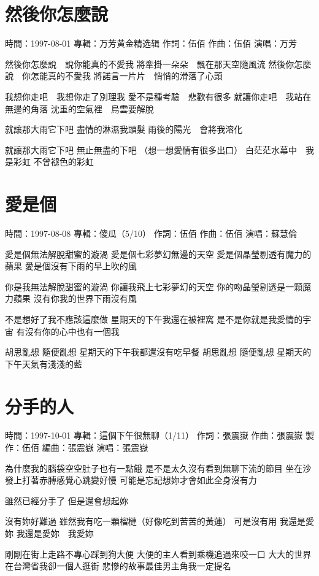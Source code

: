 \documentclass[UTF8,a4paper,oneside,twocolumn,12pt]{ctexbook}
\newcommand{\infopair}[2]{\textbullet #1：#2}
\newcommand{\zc}[1][伍佰]{\infopair{作詞}{#1}}
\newcommand{\zq}[1][伍佰]{\infopair{作曲}{#1}}
\newcommand{\bq}[1][伍佰]{\infopair{編曲}{#1}}
\newcommand{\zj}[1]{\infopair{專輯}{#1}}
\newcommand{\zz}[1]{\infopair{製作}{#1}}
\newcommand{\sj}[1]{\infopair{時間}{#1}}
\newenvironment{info}{\begin{flushleft}\kaishu
	}
	{\end{flushleft}\normalsize\yahei\par}
\newenvironment{lyric}{
	}
{}
\begin{document}
\section{然後你怎麼說}
\begin{info}
	\sj{1997-08-01}
	\zj{万芳黄金精选辑}
	\zc
	\zq
	\infopair{演唱}{万芳}
\end{info}
\begin{lyric}
	然後你怎麼說　說你能真的不愛我
	將牽掛一朵朵　飄在那天空隨風流
	然後你怎麼說　你怎能真的不愛我
	將諾言一片片　悄悄的滑落了心頭

	我想你走吧　我想你走了別理我
	愛不是種考驗　悲歡有很多
	就讓你走吧　我站在無邊的角落
	沈重的空氣裡　烏雲要解脫

	就讓那大雨它下吧
	盡情的淋濕我頭髮
	雨後的陽光　會將我溶化

	就讓那大雨它下吧
	無止無盡的下吧
	（想一想愛情有很多出口）
	白茫茫水幕中　我是彩虹
	不曾褪色的彩虹
\end{lyric}

\section{愛是個}
\begin{info}
	\sj{1997-08-08}
	\zj{傻瓜（5/10）}
	\zc
	\zq
	\infopair{演唱}{蘇慧倫}
\end{info}
\begin{lyric}
	愛是個無法解脫甜蜜的漩渦
	愛是個七彩夢幻無邊的天空
	愛是個晶瑩剔透有魔力的蘋果
	愛是個沒有下雨的早上吹的風

	你是我無法解脫甜蜜的漩渦
	你讓我飛上七彩夢幻的天空
	你的吻晶瑩剔透是一顆魔力蘋果
	沒有你我的世界下雨沒有風

	不是想好了我不應該這麼做
	星期天的下午我還在被裡窩
	是不是你就是我愛情的宇宙
	有沒有你的心中也有一個我

	胡思亂想 隨便亂想 星期天的下午我都還沒有吃早餐
	胡思亂想 隨便亂想 星期天的下午天氣有淺淺的藍
\end{lyric}

\section{分手的人}
\begin{info}
	\sj{1997-10-01}
	\zj{這個下午很無聊（1/11）}
	\zc[張震嶽]
	\zq[張震嶽]
	\zz{伍佰}
	\bq[張震嶽]
	\infopair{演唱}{張震嶽}
\end{info}
\begin{lyric}
	為什麼我的腦袋空空肚子也有一點餓
	是不是太久沒有看到無聊下流的節目
	坐在沙發上打著赤膊感覺心跳變好慢
	可能是忘記想妳才會如此全身沒有力

	雖然已經分手了 但是還會想起妳

	沒有妳好難過
	雖然我有吃一顆榴槤（好像吃到苦苦的黃蓮）
	可是沒有用 我還是愛妳
	我還是愛妳　我愛妳

	剛剛在街上走路不專心踩到狗大便
	大便的主人看到乘機追過來咬一口
	大大的世界在台灣省我卻一個人逛街
	悲慘的故事最佳男主角我一定提名
\end{lyric}
\end{document}
